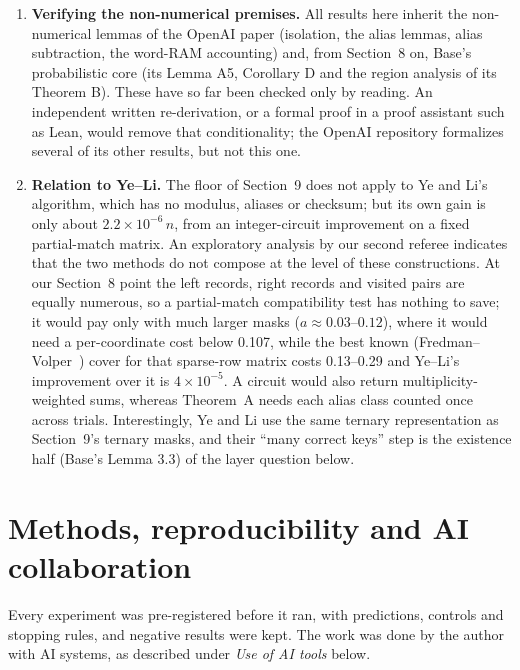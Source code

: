 \documentclass[11pt]{article}
\theoremstyle{plain}
\begin{document}
\begin{enumerate}
critical type. Getting past about 0.4895 otherwise needs a different variance argument, a list or pair improvement, or a different route.
\item \textbf{Verifying the non-numerical premises.} All results here inherit the non-numerical lemmas of the OpenAI paper (isolation, the alias lemmas, alias subtraction, the word-RAM accounting) and, from Section~8 on, Base's probabilistic core (its Lemma A5, Corollary D and the region analysis of its Theorem B). These have so far been checked only by reading. An independent written re-derivation, or a formal proof in a proof assistant such as Lean, would remove that conditionality; the OpenAI repository formalizes several of its other results, but not this one.
\item \textbf{Relation to Ye--Li.} The floor of Section~9 does not apply to Ye and Li's algorithm, which has no modulus, aliases or checksum; but its own gain is only about $2.2\times10^{-6}\, n$, from an integer-circuit improvement on a fixed partial-match matrix. An exploratory analysis by our second referee indicates that the two methods do not compose at the level of these constructions. At our Section~8 point the left records, right records and visited pairs are equally numerous, so a partial-match compatibility test has nothing to save; it would pay only with much larger masks ($a \approx 0.03$--$0.12$), where it would need a per-coordinate cost below 0.107, while the best known (Fredman--Volper~\cite{fv}) cover for that sparse-row matrix costs 0.13--0.29 and Ye--Li's improvement over it is $4\times10^{-5}$. A circuit would also return multiplicity-weighted sums, whereas Theorem~A needs each alias class counted once across trials. Interestingly, Ye and Li use the same ternary representation as Section~9's ternary masks, and their ``many correct keys'' step is the existence half (Base's Lemma 3.3) of the layer question below.
\end{enumerate}

\section{Methods, reproducibility and AI collaboration}

Every experiment was pre-registered before it ran, with predictions, controls and stopping rules, and negative results were kept. The work was done by the author with AI systems, as described under \emph{Use of AI tools} below.
\end{document}

